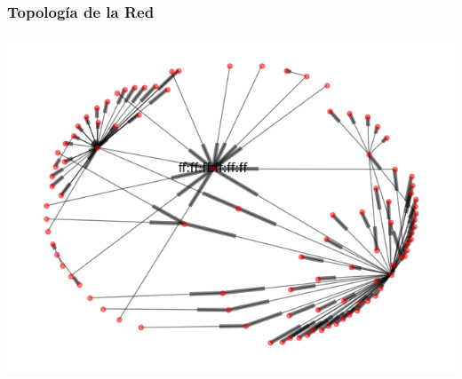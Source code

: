 \subsubsection{Topolog\'ia de la Red}
\begin{center}
 \includegraphics[scale=0.6]{../plots/labos_s2_topologia.png}
\end{center}

